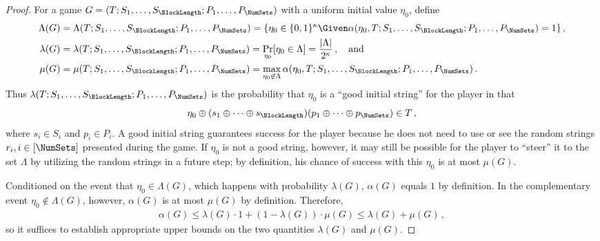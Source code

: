 \begin{proof}
\renewcommand{\S}{\mathcal{S}}
\renewcommand{\P}{\mathcal{P}}
\renewcommand{\SS}[1]{S_{#1}, \ldots, S_{\BlockLength}}
\renewcommand{\PP}[1]{P_{#1}, \ldots, P_{\NumSets}}
\renewcommand{\HatPP}[2]{\hat{P}_{#1}, \ldots, \hat{P}_{#2}}
\renewcommand{\Sfull}{ S_1, \ldots, S_\BlockLength}
\renewcommand{\Pfull}{ P_1, \ldots, P_\NumSets}

For a game $G = (T; \Sfull; \Pfull )$ with a uniform initial value $\eta_0$, define
\begin{align*}
    \Lambda(G) &= \Lambda(T ; \Sfull; \Pfull) = \{ \eta_0 \in \{0,1\}^\kappa \Given \alpha(\eta_0, T; \Sfull; \Pfull) = 1\}\,,\\
    \lambda(G) & = \lambda(T; \Sfull; \Pfull) = \Pr_{\eta_0}[\eta_0 \in \Lambda] = \frac{|\Lambda|}{2^\kappa}\,,\quad\text{and}\\
    \mu(G) &= \mu(T; \Sfull; \Pfull) = \max_{\eta_0 \not\in \Lambda} \alpha(\eta_0, T;  \Sfull; \Pfull)\,.
\end{align*}
Thus $\lambda(T; \Sfull; \Pfull)$ is the probability that $\eta_0$
is a ``good initial string'' for the player in that
\[
    \eta_0 \oplus 
    (s_1 \oplus \cdots \oplus s_\BlockLength) 
    (p_1 \oplus \cdots \oplus p_\NumSets)
    \in T
    \,,
\]
where $s_i \in S_i$ and $p_i \in P_i$.
A good initial string guarantees success for the player because
he does not need to use or see the random strings $r_i, i \in [\NumSets]$ presented during the game. 
If $\eta_0$ is not a good string, however, 
it may still be possible for the player to ``steer'' it to the set $\Lambda$ by utilizing 
the random strings in a future step; by definition, 
his chance of success with this $\eta_0$ is at most $\mu(G)$. 


Conditioned on the event that $\eta_0 \in \Lambda(G)$, 
which happens with probability $\lambda(G)$, 
$\alpha(G)$ equals $1$ by definition. 
In the complementary event $\eta_0 \not \in \Lambda(G)$, however, 
$\alpha(G)$ is at most $\mu(G)$ by definition.
Therefore, 
\begin{align}\label{eq:alpha-lambda-mu-lookahead}
    \alpha(G) \leq \lambda(G)\cdot 1 + (1 - \lambda(G)) \cdot \mu(G) \leq \lambda(G) + \mu(G)\,,
\end{align}
so it suffices to establish appropriate upper bounds on the two
quantities $\lambda(G)$ and $\mu(G)$. 



\end{proof}
